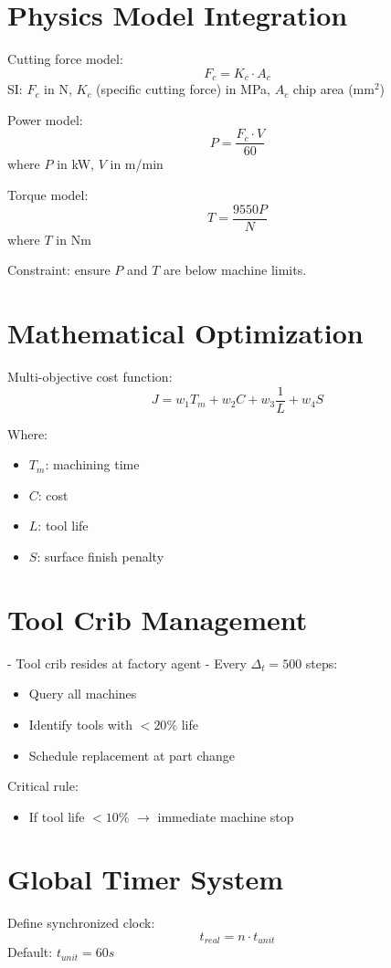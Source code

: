 \documentclass{article}
\begin{document}
\section{Physics Model Integration}
Cutting force model:
\[
F_c = K_c \cdot A_c
\]
SI: $F_c$ in N, $K_c$ (specific cutting force) in MPa, $A_c$ chip area (mm$^2$)

Power model:
\[
P = \frac{F_c \cdot V}{60}
\]
where $P$ in kW, $V$ in m/min

Torque model:
\[
T = \frac{9550 P}{N}
\]
where $T$ in Nm

Constraint: ensure $P$ and $T$ are below machine limits.

\section{Mathematical Optimization}
Multi-objective cost function:
\[
J = w_1 T_m + w_2 C + w_3 \frac{1}{L} + w_4 S
\]

Where:
\begin{itemize}
\item $T_m$: machining time
\item $C$: cost
\item $L$: tool life
\item $S$: surface finish penalty
\end{itemize}

\section{Tool Crib Management}
- Tool crib resides at factory agent
- Every $\Delta_t = 500$ steps:
\begin{itemize}
\item Query all machines
\item Identify tools with $<20\%$ life
\item Schedule replacement at part change
\end{itemize}

Critical rule:
\begin{itemize}
\item If tool life $<10\%$ $\rightarrow$ immediate machine stop
\end{itemize}

\section{Global Timer System}
Define synchronized clock:
\[
t_{real} = n \cdot t_{unit}
\]
Default: $t_{unit} = 60s$
\end{document}
